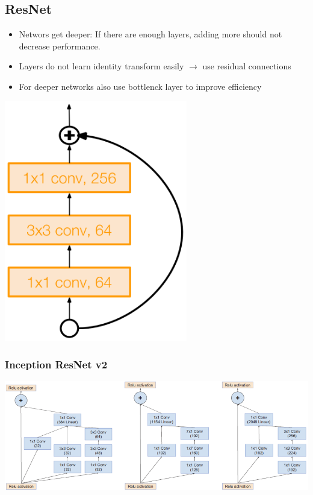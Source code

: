 \subsection{ResNet}
\begin{minipage}{0.7\textwidth}
    \begin{itemize}
        \item Networs get deeper: If there are enough layers, adding more should not decrease performance.
        \item Layers do not learn identity transform easily $\rightarrow$ use residual connections
        \item For deeper networks also use bottlenck layer to improve efficiency
    \end{itemize}
\end{minipage}
\begin{minipage}{0.3\textwidth}
    \centering
    \includegraphics[width=0.6\textwidth]{sections/NetworkArchitectures/img/resnet}
\end{minipage}


\subsubsection{Inception ResNet v2}
\includegraphics[width=\textwidth]{sections/NetworkArchitectures/img/inception_resnet.png}
